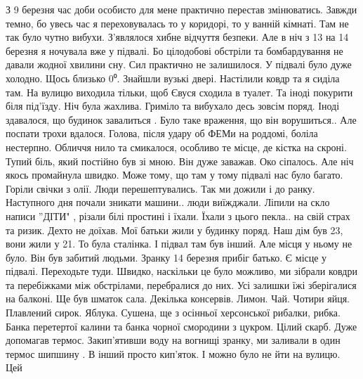  
 
 
 
 




З 9 березня час доби особисто для мене практично  перестав змінюватись. Завжди
темно, бо  увесь час я переховувалась то у коридорі, то у ванній кімнаті.  Там
не так було чутно вибухи. З'являлося хибне відчуття безпеки.  Але в ніч з 13 на
14 березня я ночувала вже у підвалі.  Бо цілодобові обстріли та бомбардування
не давали  жодної хвилини сну. Сил практично не залишилося. У підвалі було дуже
холодно. Щось близько  0⁰. Знайшли вузькі двері. Настілили ковдр та я  сиділа
там. На вулицю виходила тільки, щоб Євуся сходила в туалет. Та іноді покурити
біля під'їзду. Ніч була жахлива. Гриміло та вибухало десь зовсім поряд. Іноді
здавалося, що будинок завалиться . Було таке  враження, що він ворушиться.. Але
поспати трохи вдалося. Голова,  після удару об ФЕМи  на роддомі,  боліла
нестерпно. Обличчя нило та смикалося, особливо те місце, де кістка на скроні.
Тупий біль, який постійно  був зі мною. Він дуже заважав. Око сіпалось. Але
ніч якось промайнула швидко.  Може тому, що там у тому підвалі нас було багато.
Горіли свічки з олії. Люди перешептувались. Так ми дожили  і до ранку.
Наступного дня  почали зникати машини.. люди виїжджали.  Ліпили на скло написи
''ДІТИ" , різали білі простині і їхали. Їхали з цього пекла.. на  свій страх та
ризик. Дехто не доїхав. Мої  батьки жили у будинку поряд. Наш дім був 23, вони
жили у 21. То була сталінка. І підвал там був інший. Але місця у ньому не було.
Він був забитий людьми. Зранку 14 березня прибіг батько.  Є місце у підвалі.
Переходьте туди. Швидко, наскільки це було можливо,  ми зібрали ковдри та
перебіжками між  обстрілами, перебралися до них. Усі залишки їжі зберігалися на
балконі.  Ще був шматок сала.   Декілька консервів. Лимон. Чай. Чотири яйця.
Плавлений сирок. Яблука.  Сушена, ще з осінньої херсонської рибалки, рибка.
Банка перетертої калини та банка чорної  смородини  з цукром. Цілий скарб. Дуже
допомагав термос. Закип'ятивши воду на вогнищі зранку, ми заливали в один
термос шипшину .  В інший просто кип'яток. І можно було не йти на вулицю. Цей
